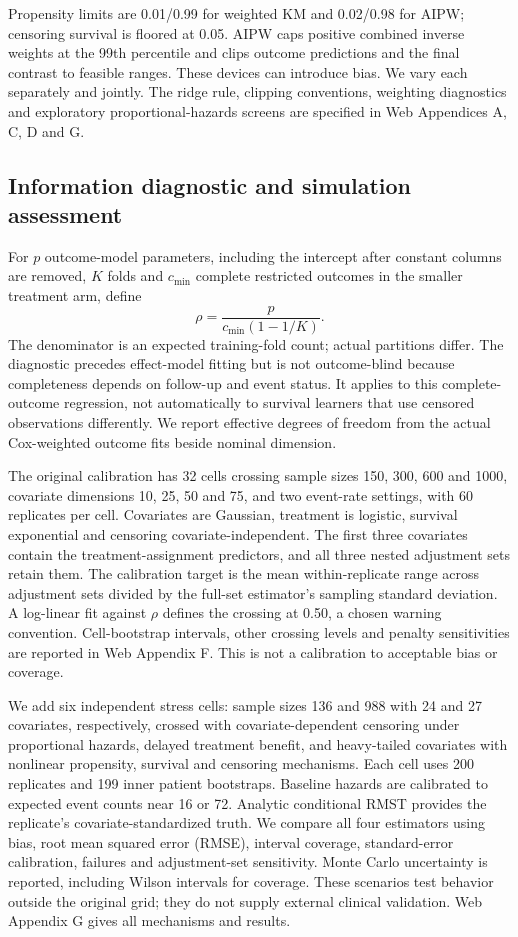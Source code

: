 \documentclass[12pt,letterpaper]{article}
\begin{document}
Propensity limits are 0.01/0.99 for weighted KM and 0.02/0.98 for AIPW; censoring survival is floored at 0.05.
AIPW caps positive combined inverse weights at the 99th percentile and clips outcome predictions and
the final contrast to feasible ranges. These devices can introduce bias. We vary each separately and jointly.
The ridge rule, clipping conventions, weighting diagnostics and exploratory proportional-hazards screens
are specified in Web Appendices A, C, D and G.

\subsection{Information diagnostic and simulation assessment}
For $p$ outcome-model parameters, including the intercept after constant columns are removed,
$K$ folds and $c_{\min}$ complete restricted outcomes in the smaller treatment arm, define
\begin{equation}
\rho=\frac{p}{c_{\min}(1-1/K)}.\label{eq:rho}
\end{equation}
The denominator is an expected training-fold count; actual partitions differ.
The diagnostic precedes effect-model fitting but is not outcome-blind because completeness depends
on follow-up and event status. It applies to this complete-outcome regression, not automatically to
survival learners that use censored observations differently. We report effective degrees of freedom
from the actual Cox-weighted outcome fits beside nominal dimension.

The original calibration has 32 cells crossing sample sizes 150, 300, 600 and 1000,
covariate dimensions 10, 25, 50 and 75, and two event-rate settings, with 60 replicates per cell.
Covariates are Gaussian, treatment is logistic, survival exponential and censoring covariate-independent.
The first three covariates contain the treatment-assignment predictors, and all three nested adjustment
sets retain them. The calibration target is the mean within-replicate range across adjustment sets divided
by the full-set estimator's sampling standard deviation. A log-linear fit against $\rho$ defines the crossing
at 0.50, a chosen warning convention. Cell-bootstrap intervals, other crossing levels and penalty sensitivities
are reported in Web Appendix F. This is not a calibration to acceptable bias or coverage.

We add six independent stress cells: sample sizes 136 and 988 with 24 and 27 covariates, respectively,
crossed with covariate-dependent censoring under proportional hazards, delayed treatment benefit,
and heavy-tailed covariates with nonlinear propensity, survival and censoring mechanisms.
Each cell uses 200 replicates and 199 inner patient bootstraps.
Baseline hazards are calibrated to expected event counts near 16 or 72.
Analytic conditional RMST provides the replicate's covariate-standardized truth.
We compare all four estimators using bias, root mean squared error (RMSE), interval coverage,
standard-error calibration, failures and adjustment-set sensitivity. Monte Carlo uncertainty is reported,
including Wilson intervals for coverage. These scenarios test behavior outside the original grid;
they do not supply external clinical validation. Web Appendix G gives all mechanisms and results.
\end{document}

